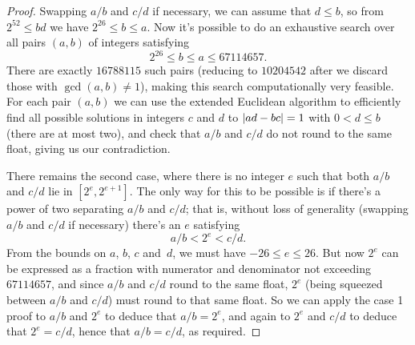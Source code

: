\documentclass[a4paper]{article}
\DeclarePairedDelimiter\abs{\lvert}{\rvert}
\theoremstyle{plain}
\theoremstyle{definition}
\begin{document}
\begin{proof}
    Swapping $a/b$ and $c/d$ if necessary, we can assume that $d \le b$, so
    from $2^{52} \le bd$ we have $2^{26} \le b \le a$. Now it's possible to do
    an exhaustive search over all pairs $(a, b)$ of integers satisfying
    \[2^{26} \le b \le a \le 67114657.\]
    There are exactly $16788115$ such
    pairs (reducing to $10204542$ after we discard those with $\gcd(a, b) \ne
    1$), making this search computationally very feasible. For each pair $(a,
    b)$ we can use the extended Euclidean algorithm to efficiently find all
    possible solutions in integers $c$ and $d$ to $\abs{ad - bc} = 1$ with $0 <
    d \le b$ (there are at most two), and check that $a/b$ and $c/d$ do not
    round to the same float, giving us our contradiction.

    There remains the second case, where there is no integer $e$ such that
    both $a/b$ and $c/d$ lie in $[2^e, 2^{e+1}]$. The only way for this to
    be possible is if there's a power of two separating $a/b$ and $c/d$; that
    is, without loss of generality (swapping $a/b$ and $c/d$ if necessary)
    there's an $e$ satisfying
    \[a/b < 2^e < c/d.\]
    From the bounds on $a$, $b$, $c$ and~$d$, we must have
    $-26 \le e \le 26$. But now $2^e$ can be expressed as a fraction with
    numerator and denominator not exceeding $67114657$, and since $a/b$ and
    $c/d$ round to the same float, $2^e$ (being squeezed between $a/b$ and
    $c/d$) must round to that same float. So we can apply the case 1 proof to
    $a/b$ and $2^e$ to deduce that $a/b = 2^e$, and again to $2^e$ and $c/d$ to
    deduce that $2^e = c/d$, hence that $a/b = c/d$, as required.
\end{proof}
\end{document}

